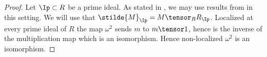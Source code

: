 
\begin{proof}
Let $\Ip \subset R$ be a prime ideal.
As stated in , we may use results from \cite[Tag 01BH]{stacks} in this setting.
We will use that $\stilde{M}_{\Ip} = M \tensor_R R_{\Ip}$.
Localized at every prime ideal of $R$
the map $\omega^2$ sends $m$ to $m\tensor 1$,
hence is the inverse of the multiplication map which is an isomorphism.
Hence non-localized $\omega^2$ is an isomorphism.
\end{proof}

